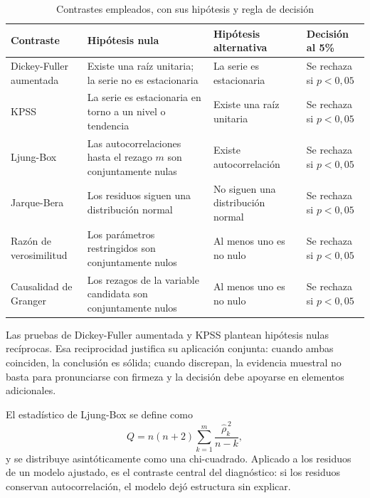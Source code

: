 \begin{table}[htbp]
\centering
\caption{Contrastes empleados, con sus hipótesis y regla de decisión}
\label{tab:contrastes}
\small
\begin{tabular}{p{3.1cm}p{4.2cm}p{4.2cm}p{3.1cm}}
\toprule
\textbf{Contraste} & \textbf{Hipótesis nula} & \textbf{Hipótesis alternativa} & \textbf{Decisión al 5\%} \\
\midrule
Dickey-Fuller aumentada & Existe una raíz unitaria; la serie no es estacionaria & La serie es estacionaria & Se rechaza si $p < 0{,}05$ \\
\addlinespace
KPSS & La serie es estacionaria en torno a un nivel o tendencia & Existe una raíz unitaria & Se rechaza si $p < 0{,}05$ \\
\addlinespace
Ljung-Box & Las autocorrelaciones hasta el rezago $m$ son conjuntamente nulas & Existe autocorrelación & Se rechaza si $p < 0{,}05$ \\
\addlinespace
Jarque-Bera & Los residuos siguen una distribución normal & No siguen una distribución normal & Se rechaza si $p < 0{,}05$ \\
\addlinespace
Razón de verosimilitud & Los parámetros restringidos son conjuntamente nulos & Al menos uno es no nulo & Se rechaza si $p < 0{,}05$ \\
\addlinespace
Causalidad de Granger & Los rezagos de la variable candidata son conjuntamente nulos & Al menos uno es no nulo & Se rechaza si $p < 0{,}05$ \\
\bottomrule
\end{tabular}
\end{table}

Las pruebas de Dickey-Fuller aumentada \parencite{dickey1979} y KPSS
\parencite{kwiatkowski1992} plantean hipótesis nulas recíprocas. Esa reciprocidad justifica su
aplicación conjunta: cuando ambas coinciden, la conclusión es sólida; cuando discrepan, la evidencia muestral no basta para pronunciarse con firmeza y la decisión debe apoyarse
en elementos adicionales.

El estadístico de Ljung-Box \parencite{ljung1978} se define como
\begin{equation}
Q = n(n+2) \sum_{k=1}^{m} \frac{\hat{\rho}_k^{\,2}}{n-k},
\end{equation}
y se distribuye asintóticamente como una chi-cuadrado. Aplicado a los residuos de un modelo ajustado, es el contraste central del diagnóstico: si los residuos conservan
autocorrelación, el modelo dejó estructura sin explicar.

